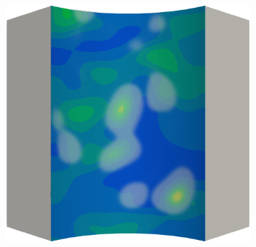 \begin{frame}
\begin{columns}[T]
\begin{column}{0.6\textwidth}
\begin{figure}
{\begin{subfigure}{0.19\textwidth}
          \end{subfigure}
          \hspace{0.06\textwidth}
          \begin{subfigure}{0.19\textwidth}
            \centering
            \includegraphics[width=\textwidth]{examples/figures/ep.0009}
          \end{subfigure}
        }
        

\end{figure}
\end{column}
\end{columns}
\end{frame}
